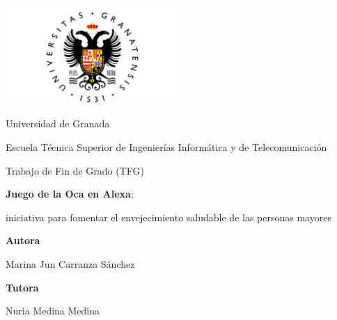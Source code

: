 \documentclass[12pt]{article}
\begin{document}
\begin{titlepage}
    \centering
    \begin{minipage}{1\textwidth}
        \raisebox{-0.7\height}
        {\includegraphics[width=0.5\textwidth]{UGR-Logo}}
    \end{minipage}
   
    \vspace{1.5cm}

    {\LARGE Universidad de Granada \par}
    \vspace{0.5cm}

    {\Large Escuela Técnica Superior de Ingenierías Informática y de Telecomunicación \par}

    \vspace{1cm}
    
    {\LARGE {Trabajo de Fin de Grado (TFG)} \par}
    \vspace{1.5cm}

    {\Huge \textbf{Juego de la Oca en Alexa}:
    	
	iniciativa para fomentar el envejecimiento saludable de las personas mayores \par}
    
    \vspace{1.5cm}

    \vfill

    {\Large \textbf{Autora} \par}
    {\Large Marina Jun Carranza Sánchez \par}
    \vspace{0.5cm}

    {\Large \textbf{Tutora} \par}
    {\Large Nuria Medina Medina \par}
    
\end{titlepage}
\end{document}
